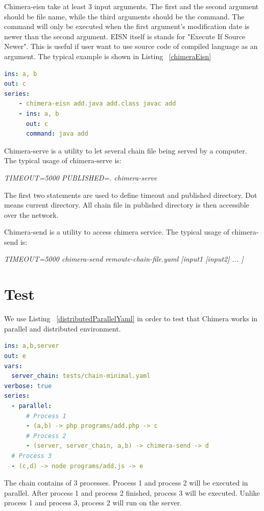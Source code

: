 \documentclass[conference]{IEEEtran}
\begin{document}
Chimera-eisn take at least 3 input arguments. The first and the second argument should
be file name, while the third arguments should be the command. The command will only
be executed when the first argument's modification date is newer than the second 
argument. EISN itself is stands for "Execute If Source Newer". This is useful if user
want to use source code of compiled language as an argument. 
The typical example is shown in Listing ~\ref{chimeraEisn}

\begin{lstlisting}[caption=Chimera-eisn usage example, label=chimeraEisn, language=yaml, basicstyle=\small, breaklines=true]
ins: a, b
out: c
series:
    - chimera-eisn add.java add.class javac add
    - ins: a, b
      out: c
      command: java add
\end{lstlisting}

Chimera-serve is a utility to let several chain file being served by a computer.
The typical usage of chimera-serve is:

{\it TIMEOUT=5000 PUBLISHED=. chimera-serve}

The first two statements are used to define timeout and published directory. Dot means
current directory. All chain file in published directory is then accessible over
the network.

Chimera-send is a utility to access chimera service.
The typical usage of chimera-send is: 

{\it TIMEOUT=5000 chimera-send remoute-chain-file.yaml [input1 [input2] ... ]}


\section{Test}

We use Listing ~\ref{distributedParallelYaml} in order to test that Chimera works
in parallel and distributed environment.

\begin{lstlisting}[caption=Distributed and Parallel YAML-chain Scenario, label=distributedParallelYaml, language=yaml, basicstyle=\small, breaklines=true]
ins: a,b,server
out: e
vars:
  server_chain: tests/chain-minimal.yaml 
verbose: true
series:
  - parallel:
      # Process 1
      - (a,b) -> php programs/add.php -> c
      # Process 2
      - (server, server_chain, a,b) -> chimera-send -> d
  # Process 3
  - (c,d) -> node programs/add.js -> e
\end{lstlisting}

The chain contains of 3 processes. Process 1 and process 2 will be executed in parallel.
After process 1 and process 2 finished, process 3 will be executed. Unlike process 1 and
process 3, process 2 will run on the server.
\end{document}
